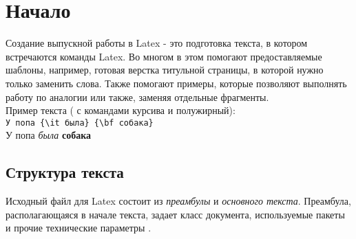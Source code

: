 





\cleardoublepage               %

\renewcommand\contentsname{Содержание}
\tableofcontents

\cleardoublepage                    %

\setcounter{page}{4}  %





\chapter{Начало}

Создание выпускной работы в Latex - это подготовка текста, в котором встречаются команды Latex. Во многом в этом помогают предоставляемые шаблоны, например, готовая верстка титульной страницы, в которой нужно только заменить слова. Также помогают примеры, которые позволяют выполнять работу по аналогии или также, заменяя отдельные фрагменты. \\
Пример текста ( с командами курсива и полужирный):\\
\verb|У попа {\it была} {\bf собака}|\\
У попа {\it была} {\bf собака}

\section{Структура текста}
Исходный файл для Latex состоит из {\it преамбулы} и {\it основного текста}. Преамбула, располагающаяся в начале текста, задает класс документа, используемые пакеты и прочие технические параметры \cite[][с.~10]{__2010}.


